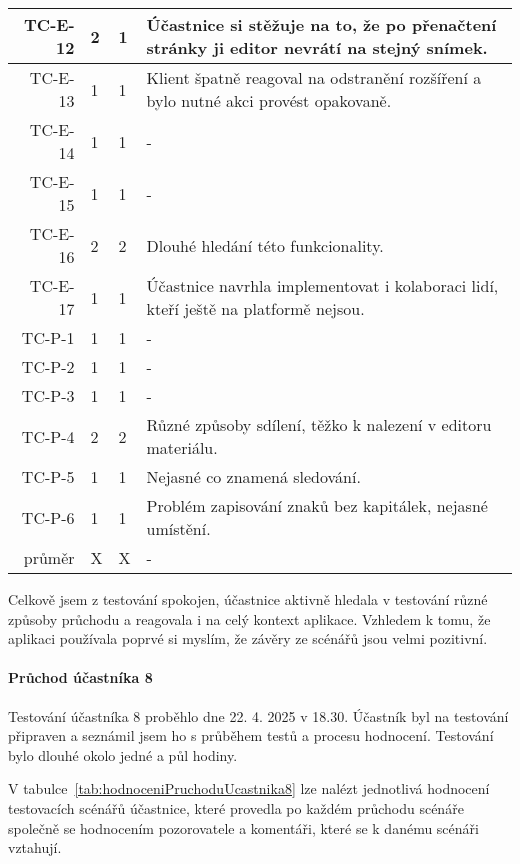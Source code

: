 \begin{longtable}{r|p{2cm}|p{2cm}|p{6cm}}
TC-E-12  & 2 & 1 & Účastnice si stěžuje na to, že po přenačtení stránky ji editor nevrátí na stejný snímek. \\\hline
TC-E-13  & 1 & 1 & Klient špatně reagoval na odstranění rozšíření a bylo nutné akci provést opakovaně. \\\hline
TC-E-14  & 1 & 1 & - \\\hline
TC-E-15  & 1 & 1 & - \\\hline
TC-E-16  & 2 & 2 & Dlouhé hledání této funkcionality. \\\hline
TC-E-17  & 1 & 1 & Účastnice navrhla implementovat i kolaboraci lidí, kteří ještě na platformě nejsou. \\\hline
TC-P-1   & 1 & 1 & - \\\hline
TC-P-2   & 1 & 1 & - \\\hline
TC-P-3   & 1 & 1 & - \\\hline
TC-P-4   & 2 & 2 & Různé způsoby sdílení, těžko k nalezení v editoru materiálu. \\\hline
TC-P-5   & 1 & 1 & Nejasné co znamená sledování. \\\hline
TC-P-6   & 1 & 1 & Problém zapisování znaků bez kapitálek, nejasné umístění. \\\hline\hline
průměr   & X & X & - \\
\end{longtable}

Celkově jsem z testování spokojen, účastnice aktivně hledala v testování různé způsoby průchodu a reagovala i na celý kontext aplikace.
Vzhledem k tomu, že aplikaci používala poprvé si myslím, že závěry ze scénářů jsou velmi pozitivní.

\paragraph{Průchod účastníka 8}

Testování účastníka 8 proběhlo dne 22. 4. 2025 v 18.30. 
Účastník byl na testování připraven a seznámil jsem ho s průběhem testů a procesu hodnocení. 
Testování bylo dlouhé okolo jedné a půl hodiny.

V tabulce~\ref{tab:hodnoceniPruchoduUcastnika8} lze nalézt jednotlivá hodnocení testovacích scénářů účastnice, které provedla po každém průchodu scénáře společně se hodnocením pozorovatele a komentáři, které se k danému scénáři vztahují.


